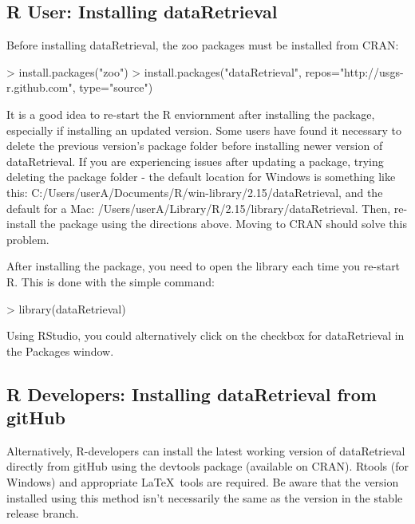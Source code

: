 \documentclass[a4paper,11pt]{article}
\begin{document}
\subsection{R User: Installing dataRetrieval}
Before installing dataRetrieval, the zoo packages must be installed from CRAN:

\begin{Schunk}
\begin{Sinput}
> install.packages("zoo")
> install.packages("dataRetrieval", repos="http://usgs-r.github.com", type="source")
\end{Sinput}
\end{Schunk}

It is a good idea to re-start the R enviornment after installing the package, especially if installing an updated version. Some users have found it necessary to delete the previous version's package folder before installing newer version of dataRetrieval. If you are experiencing issues after updating a package, trying deleting the package folder - the default location for Windows is something like this: C:/Users/userA/Documents/R/win-library/2.15/dataRetrieval, and the default for a Mac: /Users/userA/Library/R/2.15/library/dataRetrieval. Then, re-install the package using the directions above. Moving to CRAN should solve this problem.

After installing the package, you need to open the library each time you re-start R.  This is done with the simple command:
\begin{Schunk}
\begin{Sinput}
> library(dataRetrieval)
\end{Sinput}
\end{Schunk}
Using RStudio, you could alternatively click on the checkbox for dataRetrieval in the Packages window.

\subsection{R Developers: Installing dataRetrieval from gitHub}
Alternatively, R-developers can install the latest working version of dataRetrieval directly from gitHub using the devtools package (available on CRAN).  Rtools (for Windows) and appropriate \LaTeX\ tools are required. Be aware that the version installed using this method isn't necessarily the same as the version in the stable release branch.  
\end{document}
